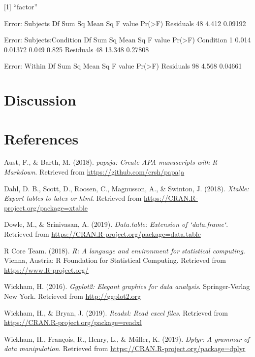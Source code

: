 \documentclass[man]{apa6}
\begin{document}
{[}1{]} \enquote{factor}

Error: Subjects Df Sum Sq Mean Sq F value Pr(\textgreater{}F) Residuals
48 4.412 0.09192

Error: Subjects:Condition Df Sum Sq Mean Sq F value Pr(\textgreater{}F)
Condition 1 0.014 0.01372 0.049 0.825 Residuals 48 13.348 0.27808

Error: Within Df Sum Sq Mean Sq F value Pr(\textgreater{}F) Residuals 98
4.568 0.04661

\section{Discussion}\label{discussion}

\newpage

\section{References}\label{references}

\begingroup
\setlength{\parindent}{-0.5in} \setlength{\leftskip}{0.5in}

\hypertarget{refs}{}
\hypertarget{ref-R-papaja}{}
Aust, F., \& Barth, M. (2018). \emph{papaja: Create APA manuscripts with
R Markdown}. Retrieved from \url{https://github.com/crsh/papaja}

\hypertarget{ref-R-xtable}{}
Dahl, D. B., Scott, D., Roosen, C., Magnusson, A., \& Swinton, J.
(2018). \emph{Xtable: Export tables to latex or html}. Retrieved from
\url{https://CRAN.R-project.org/package=xtable}

\hypertarget{ref-R-data.table}{}
Dowle, M., \& Srinivasan, A. (2019). \emph{Data.table: Extension of
`data.frame`}. Retrieved from
\url{https://CRAN.R-project.org/package=data.table}

\hypertarget{ref-R-base}{}
R Core Team. (2018). \emph{R: A language and environment for statistical
computing}. Vienna, Austria: R Foundation for Statistical Computing.
Retrieved from \url{https://www.R-project.org/}

\hypertarget{ref-R-ggplot2}{}
Wickham, H. (2016). \emph{Ggplot2: Elegant graphics for data analysis}.
Springer-Verlag New York. Retrieved from \url{http://ggplot2.org}

\hypertarget{ref-R-readxl}{}
Wickham, H., \& Bryan, J. (2019). \emph{Readxl: Read excel files}.
Retrieved from \url{https://CRAN.R-project.org/package=readxl}

\hypertarget{ref-R-dplyr}{}
Wickham, H., François, R., Henry, L., \& Müller, K. (2019). \emph{Dplyr:
A grammar of data manipulation}. Retrieved from
\url{https://CRAN.R-project.org/package=dplyr}

\endgroup
\end{document}
